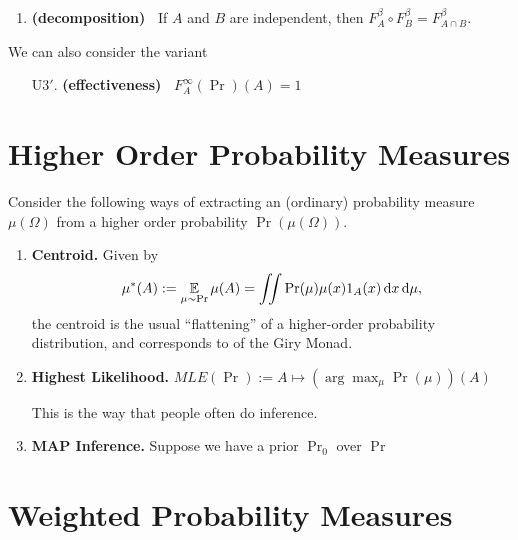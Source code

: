 \documentclass{article}
\DeclareMathOperator{\supp}{\mathrm{Supp}}
\begin{document}

\begin{enumerate}[resume,label=U\arabic{*}.]
    \item \textbf{(decomposition)~} If $A$ and $B$ are independent, then $F^{\beta}_A \circ F^{\beta}_B = F^{\beta}_{A \cap B}$.
\end{enumerate}

We can also consider the variant
\begin{enumerate}
    \item[U3$'$.]  \textbf{(effectiveness)~} $F^\infty_A (\Pr)(A) = 1$

\end{enumerate}

\section{Higher Order Probability Measures}
Consider the following ways of extracting an (ordinary) probability measure $\mu(\Omega)$
from a higher order probability $\Pr(\mu(\Omega))$.

\begin{enumerate}
    \item \textbf{Centroid.}  
        Given by 
        \[
            \mu^*(A) := \operatorname*{\mathbb{E}}_{\mu \sim \Pr} \mu(A) = 
                \iint \Pr(\mu) \mu(x) 1_{A}(x)\, \mathrm d x\,\mathrm d\mu,
        \]
        the centroid is the usual ``flattening'' of a higher-order probability distribution, and corresponds to 
        of the Giry Monad.
        
    \item \textbf{Highest Likelihood.}    
        $\textit{MLE}(\Pr) := A \mapsto (\arg\max_\mu \Pr(\mu))(A)$
        
        This is the way that people often do inference.
        
    \item \textbf{MAP Inference.}
        Suppose we have a prior $\Pr_0$ over  $\Pr$

\end{enumerate}
 


\section{Weighted Probability Measures}
\end{document}
